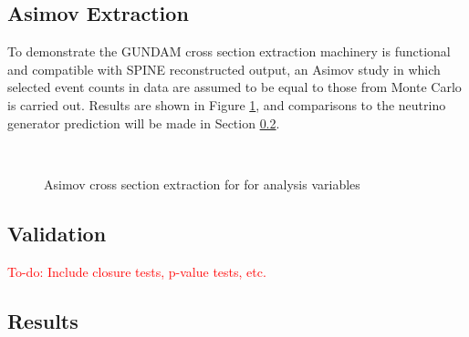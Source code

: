 \documentclass[../main.tex]{subfiles}
\begin{document}
\subsection{Asimov Extraction}
To demonstrate the GUNDAM cross section extraction machinery is functional and compatible with SPINE reconstructed output, an Asimov study in which selected event counts in data are assumed to be equal to those from Monte Carlo is carried out.  Results are shown in Figure \ref{fig:xsec_var_results_asimov}, and comparisons to the neutrino generator prediction will be made in Section \ref{subsec:xsec_validation}.

\begin{figure}[H]
    \center
     \\
    \caption{Asimov cross section extraction for for analysis variables}
    \label{fig:xsec_var_results_asimov}
\end{figure}

\subsection{Validation}
\label{subsec:xsec_validation}
\textcolor{red}{To-do: Include closure tests, p-value tests, etc.}

\subsection{Results}
\end{document}
